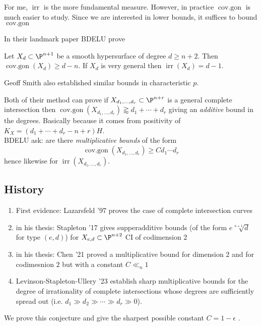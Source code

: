 \documentclass[12pt]{article}
\theoremstyle{plain}
\DeclareMathOperator{\irr}{irr}
\DeclareMathOperator{\cg}{cov.gon}
\DeclareMathOperator{\covgon}{cov.gon}
\begin{document}
{\color{red} For me, $\irr$ is the more fundamental measure. However, in practice $\cg$ is much easier to study. Since we are interested in lower bounds, it suffices to bound $\cg$}

In their landmark paper BDELU prove 

\begin{theorem}[BDELU, '17]
Let $X_d \subset \P^{n+1}$ be a smooth hypersurface of degree $d \ge n + 2$. Then $\covgon(X_d) \ge d - n$. If $X_d$ is very general then $\irr(X_d) = d - 1$. 
\end{theorem}

{\color{red} Geoff Smith also established similar bounds in characteristic $p$.} 

Both of their method can prove if $X_{d_1, \dots, d_r} \subset \P^{n+r}$ is a general complete intersection then $\cg(X_{d_1, \dots, d_r}) \gtrapprox d_1 + \cdots + d_r$ giving an \textit{additive} bound in the degrees. 
{\color{red} Basically because it comes from positivity of $K_X = (d_1 + \cdots + d_r - n+r) H$.}
\bigskip\\
BDELU ask: are there \textit{multiplicative bounds} of the form
\[ \cg(X_{d_1, \dots, d_r}) \ge C d_1 \cdots d_r \]
hence likewise for $\irr(X_{d_1, \dots, d_r})$.

\subsection{History}

\begin{enumerate}
\item First evidence: Lazarsfeld '97 proves the case of complete intersection curves
\item in his thesis: Stapleton '17 gives supperadditive bounds (of the form $e \sqrt[n+1]{d}$ for type $(e,d)$) for $X_{e,d} \subset \P^{n+2}$ CI of codimension $2$ 
\item in his thesis: Chen '21 proved a multiplicative bound for dimension $2$ and for codimesnion $2$ but with a constant $C \ll_n 1$
\item Levinson-Stapleton-Ullery '23 establish sharp multiplicative bounds for the degree of irrationality of complete intersections whose degrees are sufficiently spread out (i.e. $d_1\gg d_2\gg\cdots\gg d_r\gg0$).
\end{enumerate}

{\color{red} We prove this conjecture and give the sharpest possible constant $C = 1 - \epsilon$ .}
\end{document}
